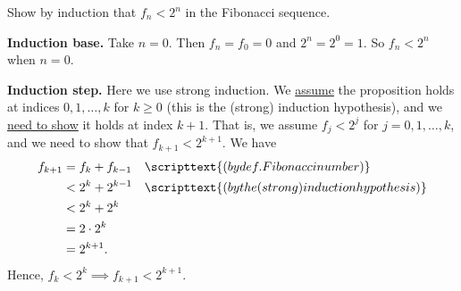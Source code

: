 \documentclass[10pt]{beamer}
\begin{document}
\begin{frame}
\small 
\begin{mygreenbox}[title=Exercise 4]
Show by induction that $f_n < 2^n$ in the Fibonacci sequence. 
\end{mygreenbox}

\vfill \vfill 
\begin{myyellowbox}[title=Solution]
\textbf{Induction base.} Take $n=0$.  Then $f_n = f_0 = 0$  and  $2^n =2^0 =1$. So $f_n < 2^n$ when $n=0$.

\vspace{0.25cm}

\textbf{Induction step.} Here we use strong induction. We \underline{assume} the proposition holds at indices $0,1, \hdots, k$ for $k \geq 0$ (this is the \alert{(strong) induction hypothesis}), and we \underline{need to show} it holds at index $k+1$.  That is, we assume $f_j < 2^j$ for $j=0,1,\hdots, k$, and we need to show that $f_{k+1} < 2^{k+1}$.  We have
%
\begin{align*}
f_{k+1} &= f_k + f_{k-1} && \scripttext{(by def. Fibonacci number)}	\\
&< 2^k + 2^{k-1} && \scripttext{(by the (strong) induction hypothesis)} \\
&< 2^k + 2^k  && \\
&= 2 \cdot 2^k  \\
&= 2^{k+1}.
\end{align*}
Hence, $f_k < 2^k \implies f_{k+1} < 2^{k+1}$.
\end{myyellowbox}
	
\end{frame}
\end{document}
